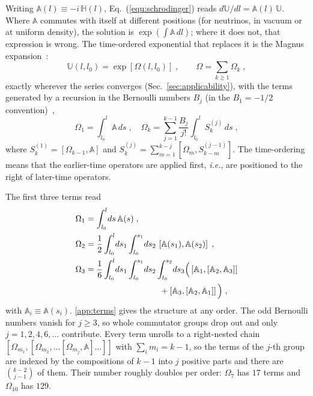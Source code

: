 \documentclass[final,5p,times,twocolumn,sort,compress]{elsarticle}
\makeatletter
\newcommand{\ie}{{\it i.e.}}
\newcommand{\eq}{Eq.}
\DeclareRobustCommand{\_}{%
  \ifmmode\nfss@text{\textunderscore}\else\textunderscore\allowbreak\fi}
\newcommand{\equ}[1]{\eq~(\ref{equ:#1})}
\makeatother
\begin{document}
Writing $\mathbb{A}(l) \equiv -i\,\mathbb{H}(l)$, \equ{schrodinger} reads $d\mathbb{U}/dl = \mathbb{A}(l)\,\mathbb{U}$. Where $\mathbb{A}$ commutes with itself at different positions (for neutrinos, in vacuum or at uniform density), the solution is $\exp \left( \int \mathbb{A}\,dl \right)$; where it does not, that expression is wrong. The time-ordered exponential that replaces it is the Magnus expansion\ \cite{Magnus:1954zz}:
\begin{equation}
 \label{equ:magnus}
 \mathbb{U}(l, l_0) = \exp\left[\Omega(l, l_0)\right] \;,
 \qquad
 \Omega = \sum_{k \geq 1} \Omega_k \;,
\end{equation}
exactly wherever the series converges (Sec.~\ref{sec:applicability}), with the terms generated by a recursion in the Bernoulli numbers $B_j$ (in the $B_1 = -1/2$ convention)\ \cite{Blanes:2008xlr},
\begin{equation}
 \label{equ:recursion}
 \Omega_1 = \int_{l_0}^{l} \mathbb{A}\,ds \;,
 \quad
 \Omega_k = \sum_{j=1}^{k-1} \frac{B_j}{j!} \int_{l_0}^{l} S_k^{(j)}\, ds \;,
\end{equation}
where $S_k^{(1)} = [\Omega_{k-1}, \mathbb{A}]$ and $S_k^{(j)} = \sum_{m=1}^{k-j} [\Omega_m, S_{k-m}^{(j-1)}]$. The time-ordering means that the earlier-time operators are applied first, \ie, are positioned to the right of later-time operators.

The first three terms read
\begin{align}
 \label{equ:omega123}
 \Omega_1 &= \int_{l_0}^{l}\! ds\, \mathbb{A}(s) \;, \nonumber \\
 \Omega_2 &= \frac{1}{2}\int_{l_0}^{l}\! ds_1 \int_{l_0}^{s_1}\! ds_2\,
 \left[\mathbb{A}(s_1), \mathbb{A}(s_2)\right] \;, \\
 \Omega_3 &= \frac{1}{6}\int_{l_0}^{l}\! ds_1 \int_{l_0}^{s_1}\! ds_2
 \int_{l_0}^{s_2}\! ds_3 \Big(
 \left[\mathbb{A}_1, [\mathbb{A}_2, \mathbb{A}_3]\right] \nonumber \\
 &\hspace{3.1cm} + \left[\mathbb{A}_3, [\mathbb{A}_2, \mathbb{A}_1]\right]
 \Big) \;, \nonumber
\end{align}
with $\mathbb{A}_i \equiv \mathbb{A}(s_i)$. \ref{app:terms} gives the structure at any order. The odd Bernoulli numbers vanish for $j \geq 3$, so whole commutator groups drop out and only $j = 1, 2, 4, 6, \ldots$ contribute. Every term unrolls to a right-nested chain $[\Omega_{m_1}, [\Omega_{m_2}, \ldots [\Omega_{m_j}, \mathbb{A}]\ldots]]$ with $\sum_i m_i = k-1$, so the terms of the $j$-th group are indexed by the compositions of $k-1$ into $j$ positive parts and there are $\binom{k-2}{j-1}$ of them. Their number roughly doubles per order: $\Omega_7$ has $17$ terms and $\Omega_{10}$ has $129$.
\end{document}
